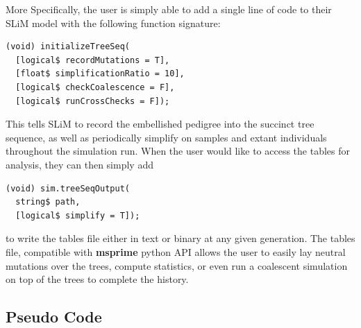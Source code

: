 \documentclass{article}
\begin{document}
More Specifically, the user is simply able to add 
a single line of code to their SLiM model with the following function signature:
\begin{lstlisting}[basicstyle=\small,] 
(void) initializeTreeSeq( 
  [logical$ recordMutations = T], 
  [float$ simplificationRatio = 10], 
  [logical$ checkCoalescence = F], 
  [logical$ runCrossChecks = F]); 

\end{lstlisting} 
This tells SLiM to record the embellished pedigree
into the succinct tree sequence, as well as periodically simplify on samples and extant individuals throughout the simulation run.
When the user would like to access the tables for analysis,
they can then simply add
\begin{lstlisting}[basicstyle=\small,] 
(void) sim.treeSeqOutput(
  string$ path,
  [logical$ simplify = T]);

\end{lstlisting} 
to write the tables file either in text or binary at any given generation. 
The tables file, compatible with \textbf{msprime} python API allows the user to easily lay neutral mutations over the trees, 
compute statistics, or even run a coalescent simulation on top of the trees to complete
the history. 

\subsection{Pseudo Code}
\end{document}
